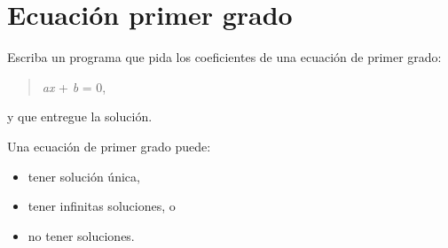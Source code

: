 \section{Ecuación primer grado}

Escriba un programa que pida los coeficientes de una ecuación de primer
grado:

\begin{quote}
\emph{ax} + \emph{b} = 0,
\end{quote}

y que entregue la solución.

Una ecuación de primer grado puede:

\begin{itemize}
\item
  tener solución única,
\item
  tener infinitas soluciones, o
\item
  no tener soluciones.
\end{itemize}
